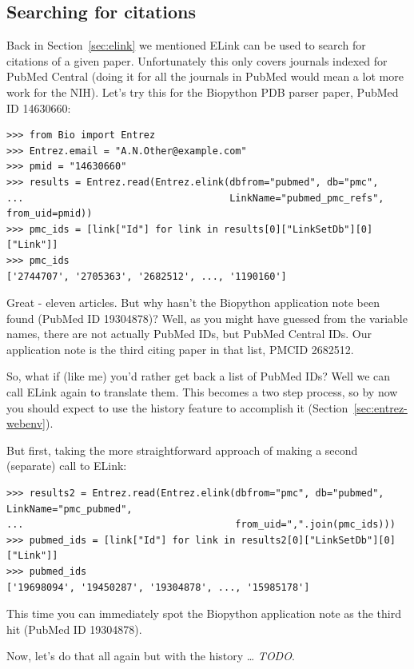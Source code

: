 \documentclass{report}
\begin{document}
\subsection{Searching for citations}
\label{sec:elink-citations}

Back in Section~\ref{sec:elink} we mentioned ELink can be used to search for citations of a given paper.
Unfortunately this only covers journals indexed for PubMed Central
(doing it for all the journals in PubMed would mean a lot more work for the NIH).
Let's try this for the Biopython PDB parser paper, PubMed ID 14630660:

\begin{verbatim}
>>> from Bio import Entrez
>>> Entrez.email = "A.N.Other@example.com"
>>> pmid = "14630660"
>>> results = Entrez.read(Entrez.elink(dbfrom="pubmed", db="pmc",
...                                    LinkName="pubmed_pmc_refs", from_uid=pmid))
>>> pmc_ids = [link["Id"] for link in results[0]["LinkSetDb"][0]["Link"]]
>>> pmc_ids
['2744707', '2705363', '2682512', ..., '1190160']
\end{verbatim}

Great - eleven articles. But why hasn't the Biopython application note been
found (PubMed ID 19304878)? Well, as you might have guessed from the variable
names, there are not actually PubMed IDs, but PubMed Central IDs. Our
application note is the third citing paper in that list, PMCID 2682512.

So, what if (like me) you'd rather get back a list of PubMed IDs? Well we
can call ELink again to translate them. This becomes a two step process,
so by now you should expect to use the history feature to accomplish it
(Section~\ref{sec:entrez-webenv}).

But first, taking the more straightforward approach of making a second
(separate) call to ELink:

\begin{verbatim}
>>> results2 = Entrez.read(Entrez.elink(dbfrom="pmc", db="pubmed", LinkName="pmc_pubmed",
...                                     from_uid=",".join(pmc_ids)))
>>> pubmed_ids = [link["Id"] for link in results2[0]["LinkSetDb"][0]["Link"]]
>>> pubmed_ids
['19698094', '19450287', '19304878', ..., '15985178']
\end{verbatim}

\noindent This time you can immediately spot the Biopython application note
as the third hit (PubMed ID 19304878).

Now, let's do that all again but with the history \ldots
\textit{TODO}.
\end{document}
